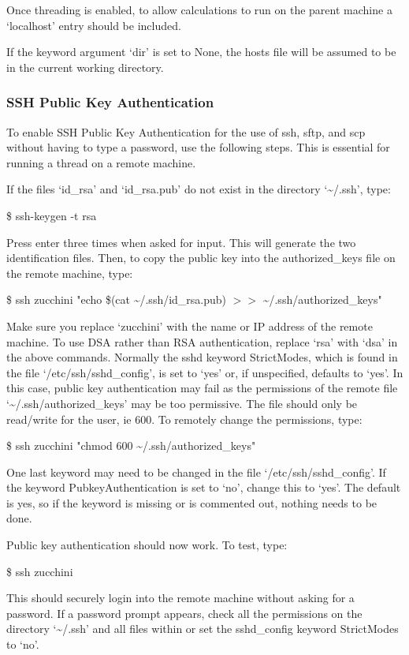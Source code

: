 Once threading is enabled, to allow calculations to run on the parent machine a `localhost'
entry should be included.


If the keyword argument `dir' is set to None, the hosts file will be assumed to be in the
current working directory.


\subsubsection{SSH Public Key Authentication}

To enable SSH Public Key Authentication for the use of ssh, sftp, and scp without having to
type a password, use the following steps.  This is essential for running a thread on a
remote machine.

If the files `id\_rsa' and `id\_rsa.pub' do not exist in the directory `\~{}/.ssh', type:

\$ ssh-keygen -t rsa

Press enter three times when asked for input.  This will generate the two identification
files.  Then, to copy the public key into the authorized\_keys file on the remote machine,
type:

\$ ssh zucchini "echo \$(cat \~{}/.ssh/id\_rsa.pub) $>>$ \~{}/.ssh/authorized\_keys"

Make sure you replace `zucchini' with the name or IP address of the remote machine.  To use
DSA rather than RSA authentication, replace `rsa' with `dsa' in the above commands.
Normally the sshd keyword StrictModes, which is found in the file `/etc/ssh/sshd\_config', is
set to `yes' or, if unspecified, defaults to `yes'.  In this case, public key authentication
may fail as the permissions of the remote file `\~{}/.ssh/authorized\_keys' may be too
permissive.  The file should only be read/write for the user, ie 600.  To remotely change
the permissions, type:

\$ ssh zucchini "chmod 600 \~{}/.ssh/authorized\_keys"

One last keyword may need to be changed in the file `/etc/ssh/sshd\_config'.  If the keyword
PubkeyAuthentication is set to `no', change this to `yes'.  The default is yes, so if the
keyword is missing or is commented out, nothing needs to be done.

Public key authentication should now work.  To test, type:

\$ ssh zucchini

This should securely login into the remote machine without asking for a password.  If a
password prompt appears, check all the permissions on the directory `\~{}/.ssh' and all files
within or set the sshd\_config keyword StrictModes to `no'.

